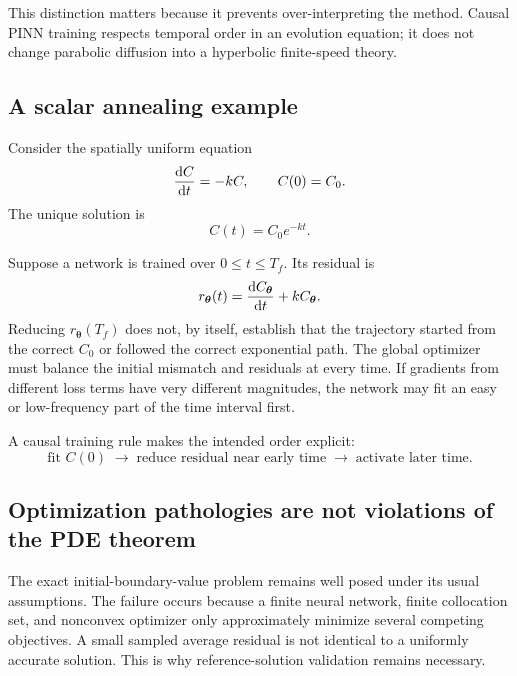 \documentclass[11pt]{article}
\newcommand{\thetav}{\bm{\theta}}
\begin{document}
This distinction matters because it prevents over-interpreting the method. Causal PINN training respects temporal order in an evolution equation; it does not change parabolic diffusion into a hyperbolic finite-speed theory.

\subsection{A scalar annealing example}

Consider the spatially uniform equation
\begin{equation}
\dv{C}{t}=-kC,
\qquad
C(0)=C_0.
\label{eq:annealing_ode}
\end{equation}
The unique solution is
\begin{equation}
C(t)=C_0e^{-kt}.
\end{equation}

Suppose a network is trained over $0\le t\le T_f$. Its residual is
\begin{equation}
r_{\thetav}(t)=\dv{C_{\thetav}}{t}+kC_{\thetav}.
\end{equation}
Reducing $r_{\thetav}(T_f)$ does not, by itself, establish that the trajectory started from the correct $C_0$ or followed the correct exponential path. The global optimizer must balance the initial mismatch and residuals at every time. If gradients from different loss terms have very different magnitudes, the network may fit an easy or low-frequency part of the time interval first.

A causal training rule makes the intended order explicit:
\begin{equation}
\text{fit }C(0)
\;\longrightarrow\;
\text{reduce residual near early time}
\;\longrightarrow\;
\text{activate later time}.
\end{equation}

\subsection{Optimization pathologies are not violations of the PDE theorem}

The exact initial-boundary-value problem remains well posed under its usual assumptions. The failure occurs because a finite neural network, finite collocation set, and nonconvex optimizer only approximately minimize several competing objectives. A small sampled average residual is not identical to a uniformly accurate solution. This is why reference-solution validation remains necessary.
\end{document}
